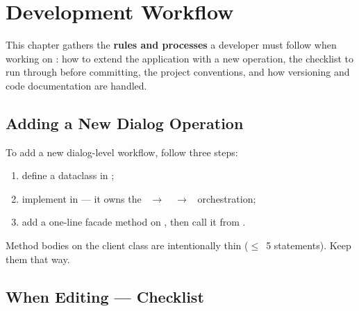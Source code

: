 \chapter{Development Workflow}
\label{chap-dev-workflow}

\renewcommand{\headrulewidth}{0.3pt}
\fancyhead[LE]{\thepage} \fancyhead[RE]{\nouppercase{\textbf{\leftmark}}}
\fancyhead[RO]{\thepage} \fancyhead[LO]{\nouppercase{\textbf{\rightmark}}}
\fancyfoot[L,C,R]{}

\setlength{\parindent}{0.35cm}

\minitoc

This chapter gathers the \textbf{rules and processes} a developer must follow when working on \cwv: how to extend the application with a new operation, the checklist to run through before committing, the project conventions, and how versioning and code documentation are handled.

\section{Adding a New Dialog Operation}
\label{sec-dev-add-op}

To add a new dialog-level workflow, follow three steps:

\begin{enumerate}
    \item define a  dataclass in ;
    \item implement  in  --- it owns the ~$\rightarrow$~~$\rightarrow$~ orchestration;
    \item add a one-line facade method on , then call it from .
\end{enumerate}

Method bodies on the client class are intentionally thin ($\leq$~5 statements). Keep them that way.

\section{When Editing --- Checklist}
\label{sec-dev-checklist}

